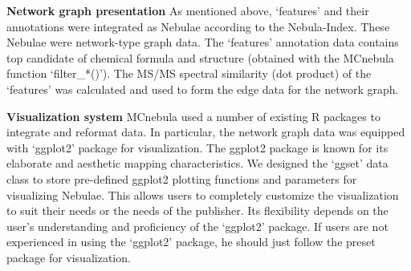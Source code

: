 \documentclass[
]{article}
\begin{document}
\textbf{Network graph presentation} As mentioned above, `features' and
their annotations were integrated as Nebulae according to the
Nebula-Index. These Nebulae were network-type graph data. The `features'
annotation data contains top candidate of chemical formula and structure
(obtained with the MCnebula function `filter\_*()'). The MS/MS spectral
similarity (dot product) of the `features' was calculated and used to
form the edge data for the network graph.

\textbf{Visualization system} MCnebula used a number of existing R
packages to integrate and reformat data. In particular, the network
graph data was equipped with `ggplot2' package for visualization. The
ggplot2 package is known for its elaborate and aesthetic mapping
characteristics. We designed the `ggset' data class to store pre-defined
ggplot2 plotting functions and parameters for visualizing Nebulae. This
allows users to completely customize the visualization to suit their
needs or the needs of the publisher. Its flexibility depends on the
user's understanding and proficiency of the `ggplot2' package. If users
are not experienced in using the `ggplot2' package, he should just
follow the preset package for visualization.
\end{document}
